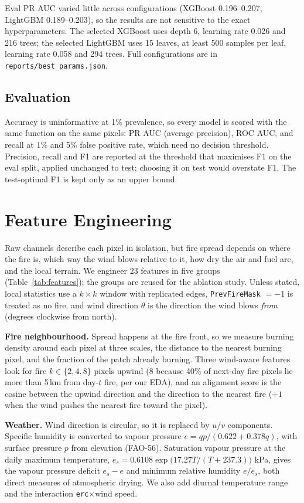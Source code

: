 Eval PR AUC varied little across configurations (XGBoost 0.196--0.207, LightGBM 0.189--0.203),
so the results are not sensitive to the exact hyperparameters. The selected XGBoost uses depth 6,
learning rate 0.026 and 216 trees; the selected LightGBM uses 15 leaves, at least 500 samples
per leaf, learning rate 0.058 and 294 trees. Full configurations are in
\texttt{reports/best\_params.json}.

\subsection{Evaluation}
Accuracy is uninformative at 1\% prevalence, so every model is scored with the same function on
the same pixels: PR AUC (average precision), ROC AUC, and recall at 1\% and 5\% false positive
rate, which need no decision threshold. Precision, recall and F1 are reported at the threshold
that maximises F1 on the eval split, applied unchanged to test; choosing it on test would
overstate F1. The test-optimal F1 is kept only as an upper bound.

\section{Feature Engineering}
Raw channels describe each pixel in isolation, but fire spread depends on where the fire is,
which way the wind blows relative to it, how dry the air and fuel are, and the local terrain.
We engineer 23 features in five groups (Table~\ref{tab:features}); the groups are reused for the
ablation study. Unless stated, local statistics use a $k\times k$ window with replicated edges,
\texttt{PrevFireMask} $=-1$ is treated as no fire, and wind direction $\theta$ is the direction
the wind blows \emph{from} (degrees clockwise from north).

\textbf{Fire neighbourhood.} Spread happens at the fire front, so we measure burning density
around each pixel at three scales, the distance to the nearest burning pixel, and the fraction of
the patch already burning. Three wind-aware features look for fire $k \in \{2,4,8\}$ pixels upwind (8 because 40\% of
next-day fire pixels lie more than 5\,km from day-$t$ fire, per our EDA), and an
alignment score is the cosine between the upwind direction and the direction to the nearest fire
($+1$ when the wind pushes the nearest fire toward the pixel).

\textbf{Weather.} Wind direction is circular, so it is replaced by $u$/$v$ components.
Specific humidity is converted to vapour pressure $e = qp/(0.622+0.378q)$, with surface pressure
$p$ from elevation (FAO-56). Saturation vapour pressure at the daily maximum temperature,
$e_s = 0.6108\exp\!\big(17.27T/(T+237.3)\big)$ kPa, gives the vapour pressure deficit
$e_s - e$ and minimum relative humidity $e/e_s$, both direct measures of atmospheric drying.
We also add diurnal temperature range and the interaction \texttt{erc}$\times$wind speed.


